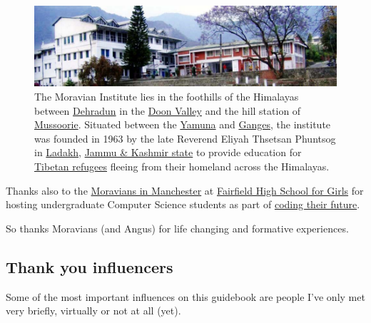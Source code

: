 \documentclass[
]{book}
\begin{document}
\begin{figure}

{\centering \includegraphics[width=1\linewidth]{images/moravian-insitute} 

}

\caption{The Moravian Institute lies in the foothills of the Himalayas between \href{https://en.wikipedia.org/wiki/Dehradun}{Dehradun} in the \href{https://en.wikipedia.org/wiki/Doon_Valley}{Doon Valley} and the hill station of \href{https://en.wikipedia.org/wiki/Mussoorie}{Mussoorie}. Situated between the \href{https://en.wikipedia.org/wiki/Yamuna}{Yamuna} and \href{https://en.wikipedia.org/wiki/Ganges}{Ganges}, the institute was founded in 1963 by the late Reverend Eliyah Thsetsan Phuntsog in \href{https://en.wikipedia.org/wiki/Ladakh}{Ladakh}, \href{https://en.wikipedia.org/wiki/Jammu_and_Kashmir_(state)}{Jammu \& Kashmir state} to provide education for \href{https://en.wikipedia.org/wiki/Tibetan_diaspora}{Tibetan refugees} fleeing from their homeland across the Himalayas.}\label{fig:moravian-fig}
\end{figure}



Thanks also to the \href{https://en.wikipedia.org/wiki/Fairfield_Moravian_Church}{Moravians in Manchester} at \href{https://en.wikipedia.org/wiki/Fairfield_High_School_for_Girls}{Fairfield High School for Girls} for hosting undergraduate Computer Science students as part of \href{https://personalpages.manchester.ac.uk/staff/duncan.hull/coding-their-future.html}{coding their future}.

So thanks Moravians (and Angus) for life changing and formative experiences. 🙏

\hypertarget{influences}{%
\subsection{Thank you influencers}\label{influences}}

Some of the most important influences on this guidebook are people I've only met very briefly, virtually or not at all (yet).
\end{document}
